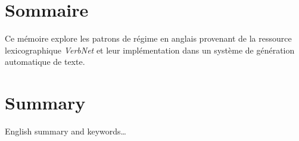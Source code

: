 \chapter*{Sommaire} 	%

\noindent Ce mémoire explore les patrons de régime en anglais provenant de la ressource lexicographique \emph{VerbNet} et leur implémentation dans un système de génération automatique de texte. 	

\chapter*{Summary}

\noindent English summary and keywords\dots

